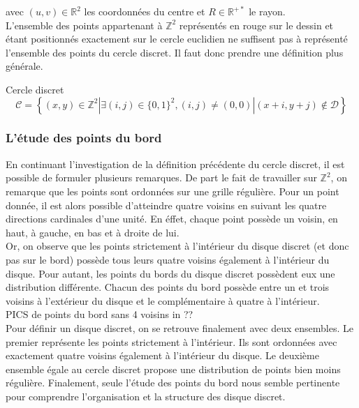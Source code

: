 avec $(u,v) \in \mathbb{R}^{2}$ les coordonnées du centre et $R \in \mathbb{R}^{+*}$ le rayon.\\


L'ensemble des points appartenant à $\mathbb{Z}^{2}$ représentés en rouge sur le dessin et étant positionnés exactement sur le cercle euclidien ne suffisent pas à représenté l'ensemble des points du cercle discret. Il faut donc prendre une définition plus générale.

\begin{Definition}{Cercle discret}
\label{def:cer-dis}
  $$ \mathcal{C} =  \left\{ (x,y) \in \mathbb{Z}^{2} | \exists (i,j) \in \{0,1\}^2, (i,j) \ne (0,0) | (x+i,y+j) \notin \mathcal{D} \right\}$$
\end{Definition}



\subsubsection{L'étude des points du bord}

En continuant l'investigation de la définition précédente du cercle discret, il est possible de formuler plusieurs remarques. De part le fait de travailler sur $\mathbb{Z}^{2}$, on remarque que les points sont ordonnées sur une grille régulière. Pour un point donnée, il est alors possible d'atteindre quatre voisins en suivant les quatre directions cardinales d'une unité. En éffet, chaque point possède un voisin, en haut, à gauche, en bas et à droite de lui. \\


Or, on observe que les points strictement à l'intérieur du disque discret (et donc pas sur le bord) possède tous leurs quatre voisins également à l'intérieur du disque. Pour autant, les points du bords du disque discret possèdent eux une distribution différente. Chacun des points du bord possède entre un et trois voisins à l'extérieur du disque et le complémentaire à quatre à l'intérieur.\\

PICS de points du bord sans 4 voisins in ??\\

Pour définir un disque discret, on se retrouve finalement avec deux ensembles. Le premier représente les points strictement à l'intérieur. Ils sont ordonnées avec exactement quatre voisins également à l'intérieur du disque. Le deuxième ensemble égale au cercle discret propose une distribution de points bien moins régulière. Finalement, seule l'étude des points du bord nous semble pertinente pour comprendre l'organisation et la structure des disque discret.


